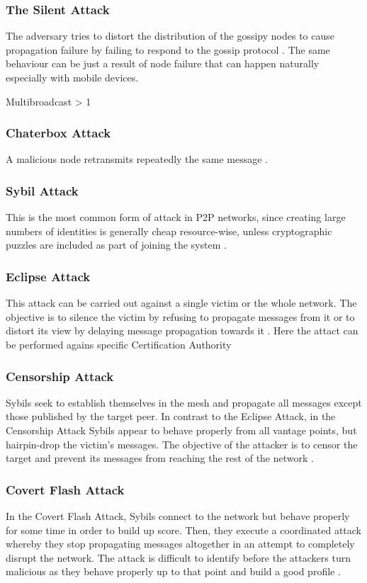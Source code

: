 \documentclass{article}
\begin{document}
\subsubsection{The Silent Attack}
The adversary tries to distort the distribution of the gossipy nodes to cause propagation failure by failing to respond to the gossip protocol \cite{AdHocNet}. The same behaviour can be just a result of node failure that can happen naturally especially with mobile devices.

Multibroadcast > 1


\subsubsection{Chaterbox Attack}
A malicious node retransmits repeatedly the same message \cite{AdHocNet}.

\subsubsection{Sybil Attack}
This is the most common form of attack in P2P networks, since creating large numbers of identities is
generally cheap resource-wise, unless cryptographic puzzles are included as part of joining the system \cite{GossipSub}.

\subsubsection{Eclipse Attack}
This attack can be carried out against a single victim or the whole network. The objective is to
silence the victim by refusing to propagate messages from it or to distort its view by delaying message propagation towards it \cite{GossipSub}.
Here the attact can be performed agains specific Certification Authority

\subsubsection{Censorship Attack}
Sybils seek to establish themselves in the mesh and propagate all messages except those published by the target peer. In contrast to the Eclipse Attack, in the Censorship Attack Sybils appear to behave properly
from all vantage points, but hairpin-drop the victim's messages. The objective of the attacker is to censor the target and prevent its messages from reaching the rest of the network \cite{GossipSub}.

\subsubsection{Covert Flash Attack}
In the Covert Flash Attack, Sybils connect to the network but behave properly for some time in order to build up score. Then, they execute a coordinated attack whereby they stop propagating messages altogether in an attempt to completely disrupt the network. The attack is difficult to identify before the attackers turn malicious as they behave properly up to that point and build a good profile \cite{GossipSub}.
\end{document}
